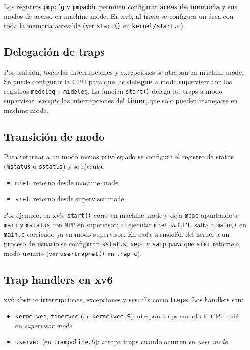 \documentclass[11pt,a4paper]{article}
\begin{document}
Los registros \texttt{pmpcfg} y \texttt{pmpaddr} permiten configurar
\textbf{áreas de memoria} y sus modos de acceso en machine mode. En
xv6, al inicio se configura un área con toda la memoria accesible
(ver \texttt{start()} en \texttt{kernel/start.c}).

\subsection{Delegación de traps}

Por omisión, \emph{todas} las interrupciones y excepciones se atrapan
en machine mode. Se puede configurar la CPU para que las
\textbf{delegue} a modo supervisor con los registros \texttt{medeleg}
y \texttt{mideleg}. La función \texttt{start()} delega los traps a
modo supervisor, \emph{excepto} las interrupciones del \textbf{timer},
que sólo pueden manejarse en machine mode.

\subsection{Transición de modo}

Para retornar a un modo menos privilegiado se configura el registro de
status (\texttt{mstatus} o \texttt{sstatus}) y se ejecuta:

\begin{itemize}[leftmargin=*,nosep]
    \item \texttt{mret}: retorno desde machine mode.
    \item \texttt{sret}: retorno desde supervisor mode.
\end{itemize}

Por ejemplo, en xv6, \texttt{start()} corre en machine mode y deja
\texttt{mepc} apuntando a \texttt{main} y \texttt{mstatus} con
\texttt{MPP} en supervisor; al ejecutar \texttt{mret} la CPU salta a
\texttt{main()} en \texttt{main.c} corriendo ya en modo supervisor.
En cada transición del kernel a un proceso de usuario se configuran
\texttt{sstatus}, \texttt{sepc} y \texttt{satp} para que \texttt{sret}
retorne a modo usuario (ver \texttt{usertrapret()} en
\texttt{trap.c}).

\subsection{Trap handlers en xv6}

xv6 abstrae interrupciones, excepciones y syscalls como
\textbf{traps}. Los handlers son:

\begin{itemize}[leftmargin=*]
    \item \texttt{kernelvec}, \texttt{timervec} (en
        \texttt{kernelvec.S}): atrapan traps cuando la CPU está en
        \emph{supervisor mode}.
    \item \texttt{uservec} (en \texttt{trampoline.S}): atrapa traps
        cuando ocurren en \emph{user mode}.
\end{itemize}
\end{document}
